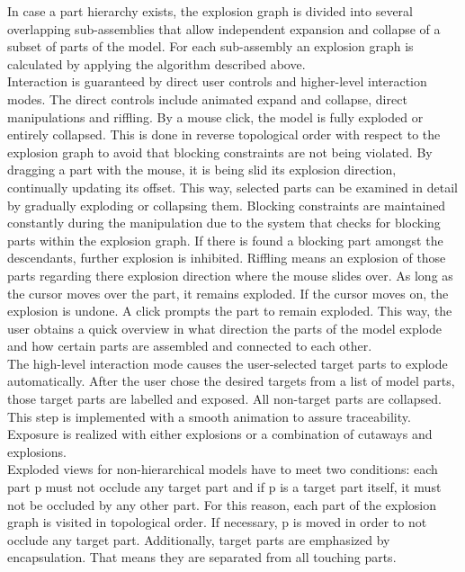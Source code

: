 In case a part hierarchy exists, the explosion graph is divided into several overlapping sub-assemblies that allow independent expansion and collapse of a subset of parts of the model. For each sub-assembly an explosion graph is calculated by applying the algorithm described above.\\
\newline
Interaction is guaranteed by direct user controls and higher-level interaction modes. The direct controls include animated expand and collapse, direct manipulations and riffling. By a mouse click, the model is fully exploded or entirely collapsed. This is done in reverse topological order with respect to the explosion graph to avoid that blocking constraints are not being violated. By dragging a part with the mouse, it is being slid its explosion direction, continually updating its offset. This way, selected parts can be examined in detail by gradually exploding or collapsing them. Blocking constraints are maintained constantly during the manipulation due to the system that checks for blocking parts within the explosion graph. If there is found a blocking part amongst the descendants, further explosion is inhibited. Riffling means an explosion of those parts regarding there explosion direction where the mouse slides over. As long as the cursor moves over the part, it remains exploded. If the cursor moves on, the explosion is undone. A click prompts the part to remain exploded. This way, the user obtains a quick overview in what direction the parts of the model explode and how certain parts are assembled and connected to each other.\\
The high-level interaction mode causes the user-selected target parts to explode automatically. After the user chose the desired targets from a list of model parts, those target parts are labelled and exposed. All non-target parts are collapsed. This step is implemented with a smooth animation to assure traceability. Exposure is realized with either explosions or a combination of cutaways and explosions.\\
Exploded views for non-hierarchical models have to meet two conditions: each part p must not occlude any target part and if p is a target part itself, it must not be occluded by any other part. For this reason, 
each part of the explosion graph is visited in topological order. If necessary, p is moved in order to not occlude any target part. Additionally, target parts are emphasized by encapsulation. That means they are separated from all touching parts.\\
